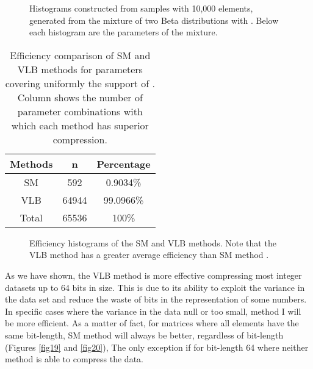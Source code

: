 \documentclass[10pt]{article}
\begin{document}
\begin{figure}[h]
  \centering
  \caption{Histograms constructed from samples with 10,000 elements, generated from the mixture of two Beta distributions with . Below each histogram are the parameters of the mixture.}
  \label{fig:13141516}
\end{figure}

\begin{table}[h]
 \centering
 \caption{Efficiency comparison of SM and VLB methods for parameters covering uniformly the support of . Column  shows the number of parameter combinations with which each method has superior compression.}
 \begin{tabular}{ccc}
  \hline 
  Methods  & n   & Percentage \\
  \hline
  SM	   & 592	& 0.9034\% \\
  VLB	   & 64944	& 99.0966\% \\
  \hline
  Total    & 65536	& 100\% \\
  \hline
 \end{tabular}
 \label{tab:02}
\end{table}

\begin{figure}[h]
  \centering
  \caption{Efficiency histograms of the SM and VLB methods. Note that the VLB method has a greater average efficiency than SM method .}
  \label{fig:1718}
\end{figure}

As we have shown, the VLB method is more effective compressing most integer datasets up to 64 bits in size. This is due to its ability to exploit the variance in the data set and reduce the waste of bits in the representation of some numbers. In specific cases where the variance in the data null or too small, method I will be more efficient. As a matter of fact, for matrices where all elements have the same bit-length, SM method  will always be better, regardless of bit-length (Figures \ref{fig19} and \ref{fig20}), The only exception if for bit-length 64 where neither method is able to compress the data. 
\end{document}
